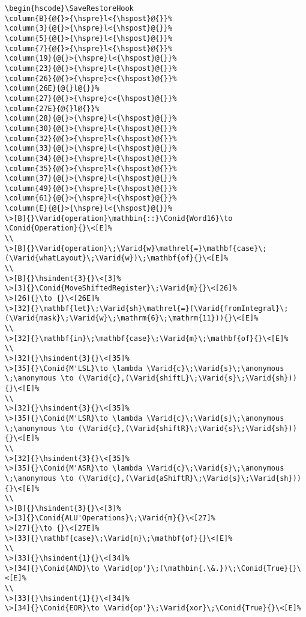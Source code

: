 \documentclass{article}
\makeatletter
\newcommand{\Conid}[1]{\mathit{#1}}
\newcommand{\Varid}[1]{\mathit{#1}}
\newcommand{\anonymous}{\kern0.06em \vbox{\hrule\@width.5em}}
\newcommand{\hsindent}[1]{\quad}%
\let\hspre\empty
\let\hspost\empty
\makeatother
\begin{document}
\begin{Verbatim}[fontsize=\scriptsize]
\begin{hscode}\SaveRestoreHook
\column{B}{@{}>{\hspre}l<{\hspost}@{}}%
\column{3}{@{}>{\hspre}l<{\hspost}@{}}%
\column{5}{@{}>{\hspre}l<{\hspost}@{}}%
\column{7}{@{}>{\hspre}l<{\hspost}@{}}%
\column{19}{@{}>{\hspre}l<{\hspost}@{}}%
\column{23}{@{}>{\hspre}l<{\hspost}@{}}%
\column{26}{@{}>{\hspre}c<{\hspost}@{}}%
\column{26E}{@{}l@{}}%
\column{27}{@{}>{\hspre}c<{\hspost}@{}}%
\column{27E}{@{}l@{}}%
\column{28}{@{}>{\hspre}l<{\hspost}@{}}%
\column{30}{@{}>{\hspre}l<{\hspost}@{}}%
\column{32}{@{}>{\hspre}l<{\hspost}@{}}%
\column{33}{@{}>{\hspre}l<{\hspost}@{}}%
\column{34}{@{}>{\hspre}l<{\hspost}@{}}%
\column{35}{@{}>{\hspre}l<{\hspost}@{}}%
\column{37}{@{}>{\hspre}l<{\hspost}@{}}%
\column{49}{@{}>{\hspre}l<{\hspost}@{}}%
\column{61}{@{}>{\hspre}l<{\hspost}@{}}%
\column{E}{@{}>{\hspre}l<{\hspost}@{}}%
\>[B]{}\Varid{operation}\mathbin{::}\Conid{Word16}\to \Conid{Operation}{}\<[E]%
\\
\>[B]{}\Varid{operation}\;\Varid{w}\mathrel{=}\mathbf{case}\;(\Varid{whatLayout}\;\Varid{w})\;\mathbf{of}{}\<[E]%
\\
\>[B]{}\hsindent{3}{}\<[3]%
\>[3]{}\Conid{MoveShiftedRegister}\;\Varid{m}{}\<[26]%
\>[26]{}\to {}\<[26E]%
\>[32]{}\mathbf{let}\;\Varid{sh}\mathrel{=}(\Varid{fromIntegral}\;(\Varid{mask}\;\Varid{w}\;\mathrm{6}\;\mathrm{11})){}\<[E]%
\\
\>[32]{}\mathbf{in}\;\mathbf{case}\;\Varid{m}\;\mathbf{of}{}\<[E]%
\\
\>[32]{}\hsindent{3}{}\<[35]%
\>[35]{}\Conid{M'LSL}\to \lambda \Varid{c}\;\Varid{s}\;\anonymous \;\anonymous \to (\Varid{c},(\Varid{shiftL}\;\Varid{s}\;\Varid{sh})){}\<[E]%
\\
\>[32]{}\hsindent{3}{}\<[35]%
\>[35]{}\Conid{M'LSR}\to \lambda \Varid{c}\;\Varid{s}\;\anonymous \;\anonymous \to (\Varid{c},(\Varid{shiftR}\;\Varid{s}\;\Varid{sh})){}\<[E]%
\\
\>[32]{}\hsindent{3}{}\<[35]%
\>[35]{}\Conid{M'ASR}\to \lambda \Varid{c}\;\Varid{s}\;\anonymous \;\anonymous \to (\Varid{c},(\Varid{aShiftR}\;\Varid{s}\;\Varid{sh})){}\<[E]%
\\
\>[B]{}\hsindent{3}{}\<[3]%
\>[3]{}\Conid{ALU'Operations}\;\Varid{m}{}\<[27]%
\>[27]{}\to {}\<[27E]%
\>[33]{}\mathbf{case}\;\Varid{m}\;\mathbf{of}{}\<[E]%
\\
\>[33]{}\hsindent{1}{}\<[34]%
\>[34]{}\Conid{AND}\to \Varid{op'}\;(\mathbin{.\&.})\;\Conid{True}{}\<[E]%
\\
\>[33]{}\hsindent{1}{}\<[34]%
\>[34]{}\Conid{EOR}\to \Varid{op'}\;\Varid{xor}\;\Conid{True}{}\<[E]%

\end{Verbatim}
\end{document}
